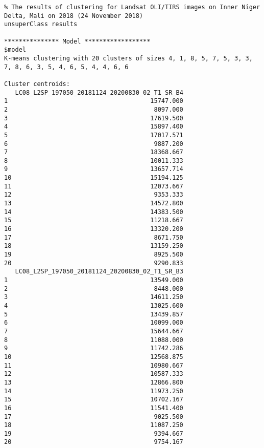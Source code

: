 \begin{scriptsize}
\begin{verbatim}
% The results of clustering for Landsat OLI/TIRS images on Inner Niger Delta, Mali on 2018 (24 November 2018)
unsuperClass results

*************** Model ******************
$model
K-means clustering with 20 clusters of sizes 4, 1, 8, 5, 7, 5, 3, 3, 7, 8, 6, 3, 5, 4, 6, 5, 4, 4, 6, 6

Cluster centroids:
   LC08_L2SP_197050_20181124_20200830_02_T1_SR_B4
1                                       15747.000
2                                        8097.000
3                                       17619.500
4                                       15897.400
5                                       17017.571
6                                        9887.200
7                                       18368.667
8                                       10011.333
9                                       13657.714
10                                      15194.125
11                                      12073.667
12                                       9353.333
13                                      14572.800
14                                      14383.500
15                                      11218.667
16                                      13320.200
17                                       8671.750
18                                      13159.250
19                                       8925.500
20                                       9290.833
   LC08_L2SP_197050_20181124_20200830_02_T1_SR_B3
1                                       13549.000
2                                        8448.000
3                                       14611.250
4                                       13025.600
5                                       13439.857
6                                       10099.000
7                                       15644.667
8                                       11088.000
9                                       11742.286
10                                      12568.875
11                                      10980.667
12                                      10587.333
13                                      12866.800
14                                      11973.250
15                                      10702.167
16                                      11541.400
17                                       9025.500
18                                      11087.250
19                                       9394.667
20                                       9754.167

\end{verbatim}
\end{scriptsize}
